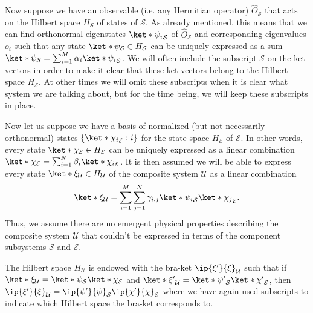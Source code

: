 \documentclass[12pt]{report}
\begin{document}
Now suppose we have an observable (i.e. any Hermitian operator) $\hat{O}_{\mathcal{S}}$  %
%
that acts on the Hilbert space $H_\mathcal{S}$  %
%
of states of $\mathcal{S}$. As already mentioned, this means that we can find orthonormal eigenstates $\ket*{\psi_i}_\mathcal{S}$ of $\hat{O}_{\mathcal{S}}$ and corresponding eigenvalues $o_i$ such that any state $\ket*{\psi}_\mathcal{S}\in H_\mathcal{S}$ can be uniquely expressed as a sum $\ket*{\psi}_\mathcal{S}=\sum_{i=1}^M\alpha_i\ket*{\psi_i}_\mathcal{S}$. We will often include the subscript $\mathcal{S}$ on the ket-vectors in order to make it clear that these ket-vectors belong to the Hilbert space $H_\mathcal{S}$. At other times we will omit these subscripts when it is clear what system we are talking about, but for the time being, we will keep these subscripts in place.
     
      Now let us suppose we have a basis of normalized (but not necessarily orthonormal) states $\{\ket*{\chi_i}_\mathcal{E}:i\}$ for the state space $H_\mathcal{E}$ of $\mathcal{E}$. In other words, every state $\ket*{\chi}_\mathcal{E}\in H_\mathcal{E}$ can be uniquely expressed as a linear combination $\ket*{\chi}_\mathcal{E}=\sum_{i=1}^N\beta_i\ket*{\chi_i}_\mathcal{E}$. It is then assumed we will be able to express every state $\ket*{\xi}_\mathcal{U}\in H_\mathcal{U}$ of the composite system $\mathcal{U}$ as a linear combination
      \begin{equation}\label{entangled}\ket*{\xi}_\mathcal{U}=\sum_{i=1}^M\sum_{j=1}^N\gamma_{i,j}\ket*{\psi_i}_\mathcal{S}\ket*{\chi_j}_\mathcal{E}.
      \end{equation}
      Thus, we assume there are no emergent physical properties describing the composite system $\mathcal{U}$ that couldn't be expressed in terms of the component subsystems $\mathcal{S}$ and $\mathcal{E}$. %
      
      The Hilbert space $H_{\mathcal{U}}$ is  endowed with the bra-ket $\ip{\xi'}{\xi}_\mathcal{U}$ such that if $\ket*{\xi}_\mathcal{U}=\ket*{\psi}_\mathcal{S}\ket*{\chi}_\mathcal{E}$ and $\ket*{\xi'}_\mathcal{U}=\ket*{\psi'}_\mathcal{S}\ket*{\chi'}_\mathcal{E}$, then $\ip{\xi'}{\xi}_\mathcal{U}=\ip{\psi'}{\psi}_\mathcal{S}\ip{\chi'}{\chi}_\mathcal{E}$ where we have again used subscripts to indicate which Hilbert space the bra-ket corresponds to. 
      
\end{document}
